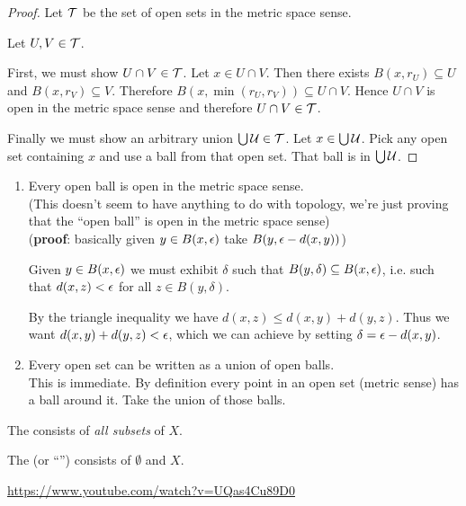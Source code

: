 \begin{proof}
  Let $\mathcal T$ be the set of open sets in the metric space sense.

  Let $U, V \in \mathcal T$.

  First, we must show $U \cap V \in \mathcal T$. Let $x \in U \cap V$. Then there exists $B(x, r_U) \subseteq U$
  and $B(x, r_V) \subseteq V$. Therefore $B(x, \min(r_U, r_V)) \subseteq U \cap V$. Hence $U \cap V$ is open
  in the metric space sense and therefore $U \cap V \in \mathcal T$.

  Finally we must show an arbitrary union $\bigcup \mathcal U \in \mathcal T$. Let $x \in \bigcup \mathcal U$. Pick any open
  set containing $x$ and use a ball from that open set. That ball is in $\bigcup \mathcal U$.
\end{proof}

\begin{lemma}
  \begin{enumerate}
  \item Every open ball is open in the metric space sense.\\
    (This doesn't seem to have anything to do with topology, we're just proving that the ``open
    ball​'' is open in the metric space sense)\\
    ({\bf proof}: basically given $y \in B(x, \epsilon)$ take $B(y, \epsilon - d(x, y))$)

    Given $y \in B(x, \epsilon)$ we must exhibit $\delta$ such that $B(y, \delta) \subseteq B(x, \epsilon)$,
    i.e. such that $d(x, z) < \epsilon$ for all $z \in B(y, \delta)$.

    By the triangle inequality we have $d(x, z) \leq d(x, y) + d(y, z)$. Thus we
    want $d(x, y) + d(y, z) < \epsilon$, which we can achieve by setting $\delta = \epsilon - d(x, y)$.


  \item Every open set can be written as a union of open balls.\\

    This is immediate. By definition every point in an open set (metric sense) has a ball around
    it. Take the union of those balls.
  \end{enumerate}
\end{lemma}




The  consists of {\it all subsets} of $X$.

The  (or ``​'') consists of $\emptyset$ and $X$.


\url{https://www.youtube.com/watch?v=UQas4Cu89D0}

